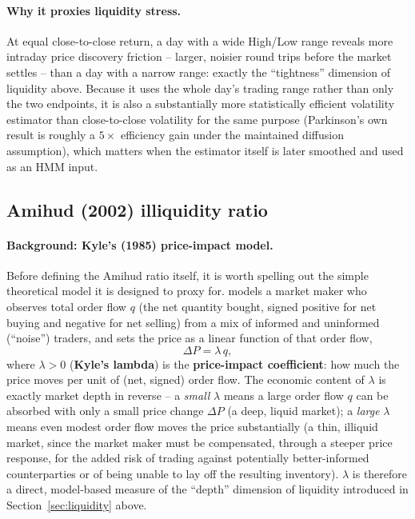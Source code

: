 \documentclass[11pt]{article}
\theoremstyle{definition}
\theoremstyle{remark}
\begin{document}
\paragraph{Why it proxies liquidity stress.} At equal close-to-close return, a day with a wide High/Low range reveals more intraday price discovery friction -- larger, noisier round trips before the market settles -- than a day with a narrow range: exactly the ``tightness'' dimension of liquidity above. Because it uses the whole day's trading range rather than only the two endpoints, it is also a substantially more statistically efficient volatility estimator than close-to-close volatility for the same purpose (Parkinson's own result is roughly a $5\times$ efficiency gain under the maintained diffusion assumption), which matters when the estimator itself is later smoothed and used as an HMM input.

\subsection{Amihud (2002) illiquidity ratio}
\label{sec:amihud}

\paragraph{Background: Kyle's (1985) price-impact model.} Before defining the Amihud ratio itself, it is worth spelling out the simple theoretical model it is designed to proxy for. \cite{kyle1985continuous} models a market maker who observes total order flow $q$ (the net quantity bought, signed positive for net buying and negative for net selling) from a mix of informed and uninformed (``noise'') traders, and sets the price as a linear function of that order flow,
\[
\Delta P = \lambda\, q,
\]
where $\lambda>0$ (\textbf{Kyle's lambda}) is the \textbf{price-impact coefficient}: how much the price moves per unit of (net, signed) order flow. The economic content of $\lambda$ is exactly market depth in reverse -- a \emph{small} $\lambda$ means a large order flow $q$ can be absorbed with only a small price change $\Delta P$ (a deep, liquid market); a \emph{large} $\lambda$ means even modest order flow moves the price substantially (a thin, illiquid market, since the market maker must be compensated, through a steeper price response, for the added risk of trading against potentially better-informed counterparties or of being unable to lay off the resulting inventory). $\lambda$ is therefore a direct, model-based measure of the ``depth'' dimension of liquidity introduced in Section~\ref{sec:liquidity} above.
\end{document}
